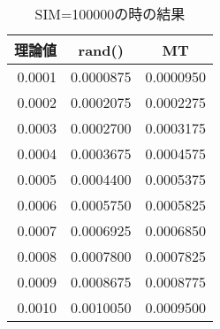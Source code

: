 \documentclass[12pt]{jarticle}
\begin{document}
\begin{table}[h]
\begin{minipage}{0.5\hsize}
    \end{minipage}
    \begin{minipage}{0.5\hsize}
        \begin{center}
            \caption{SIM=100000の時の結果}
            \begin{tabular}{|r|r|r|} \hline
                \multicolumn{1}{|c|}{理論値} & \multicolumn{1}{|c|}{rand()} & \multicolumn{1}{|c|}{MT} \\\hline
                0.0001                       & 0.0000875                    & 0.0000950                \\\hline
                0.0002                       & 0.0002075                    & 0.0002275                \\\hline
                0.0003                       & 0.0002700                    & 0.0003175                \\\hline
                0.0004                       & 0.0003675                    & 0.0004575                \\\hline
                0.0005                       & 0.0004400                    & 0.0005375                \\\hline
                0.0006                       & 0.0005750                    & 0.0005825                \\\hline
                0.0007                       & 0.0006925                    & 0.0006850                \\\hline
                0.0008                       & 0.0007800                    & 0.0007825                \\\hline
                0.0009                       & 0.0008675                    & 0.0008775                \\\hline
                0.0010                       & 0.0010050                    & 0.0009500                \\\hline
            \end{tabular}
        \end{center}
    \end{minipage}
\end{table}
\clearpage
\end{document}

